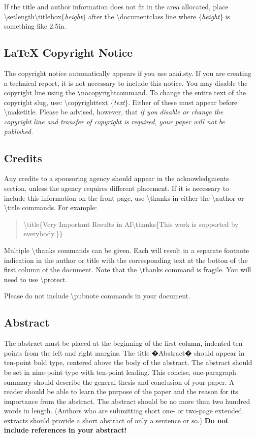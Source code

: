 \documentclass[letterpaper]{article}
\begin{document}
\noindent If the title and author information does not fit in the area allocated, place
\textbackslash setlength\textbackslash titlebox\{\textit{height}\}
after the \textbackslash documentclass line where \{\textit{height}\} is something like 2.5in.

\subsection{\LaTeX{} Copyright Notice}
The copyright notice automatically appears if you use aaai.sty. If you are creating a technical report, it is not necessary to include this notice. You may disable the copyright line using the \verb+\+nocopyrightcommand. To change the entire text of the copyright slug, use:
\textbackslash copyrighttext \{\emph{text}\}.
Either of these must appear before \textbackslash maketitle. Please be advised, however, that \textit{if you disable or change the copyright line and transfer of copyright is required, your paper will not be published.}

\subsection{Credits}
Any credits to a sponsoring agency should appear in the acknowledgments section, unless the agency requires different placement. If it is necessary to include this information on the front page, use
\textbackslash thanks in either the \textbackslash author or \textbackslash title commands.
For example:
\begin{quote}
\begin{small}
\textbackslash title\{Very Important Results in AI\textbackslash thanks\{This work is
 supported by everybody.\}\}
\end{small}
\end{quote}
Multiple \textbackslash thanks commands can be given. Each will result in a separate footnote indication in the author or title with the corresponding text at the botton of the first column of the document. Note that the \textbackslash thanks command is fragile. You will need to use \textbackslash protect.

Please do not include \textbackslash pubnote commands in your document.

\subsection{Abstract}
The abstract must be placed at the beginning of the first column, indented ten points from the left and right margins. The title �Abstract� should appear in ten-point bold type, centered above the body of the abstract. The abstract should be set in nine-point type with ten-point leading. This concise, one-paragraph summary should describe the general thesis and conclusion of your paper. A reader should be able to learn the purpose of the paper and the reason for its importance from the abstract. The abstract should be no more than two hundred words in length. (Authors who are submitting short one- or two-page extended extracts should provide a short abstract of only a sentence or so.) \textbf{Do not include references in your abstract!}
\end{document}
